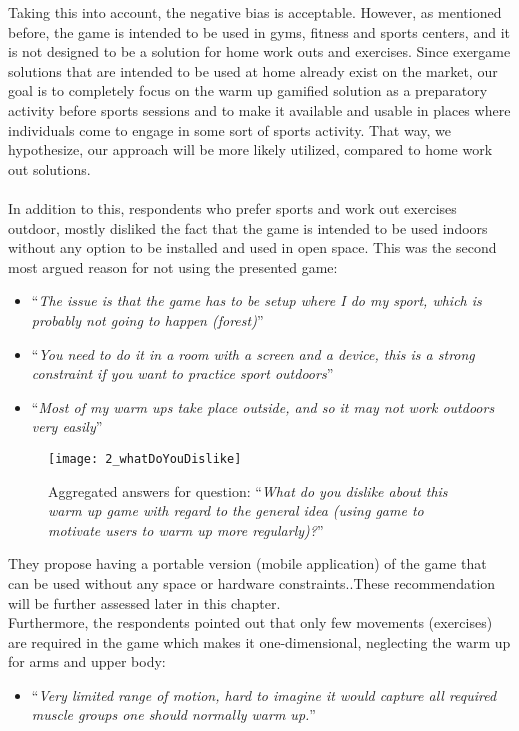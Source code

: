 Taking this into account, the negative bias is acceptable. However, as mentioned before, the game is intended to be used in gyms, fitness and sports centers, and it is not designed to be a solution for home work outs and exercises. Since exergame solutions that are intended to be used at home already exist on the market, our goal is to completely focus on the warm up gamified solution as a preparatory activity before sports sessions and to make it available and usable in places where individuals come to engage in some sort of sports activity. That way, we hypothesize, our approach will be more likely utilized, compared to home work out solutions. \\\\In addition to this, respondents who prefer sports and work out exercises outdoor, mostly disliked the fact that the game is intended to be used indoors without any option to be installed and used in open space. This was the second most argued reason for not using the presented game:
\begin{itemize}
\item ``\textit{The issue is that the game has to be setup where I do my sport, which is probably not going to happen (forest)}''
\item ``\textit{You need to do it in a room with a screen and a device, this is a strong constraint if you want to practice sport outdoors}''
\item ``\textit{Most of my warm ups take place outside, and so it may not work outdoors very easily}''
\end{itemize}
\begin{figure}[h]
    \centering
    \texttt{[image: 2\_whatDoYouDislike]}
    \caption{Aggregated answers for question: ``\textit{What do you dislike about this warm up game with regard to the general idea (using game to motivate users to warm up more regularly)?}''}
    \label{fig:2_whatDoYouDislike}
\end{figure}
They propose having a portable version (mobile application) of the game that can be used without any space or hardware constraints..These recommendation will be further assessed later in this chapter.\\ Furthermore, the respondents pointed out that only few movements (exercises) are required in the game which makes it one-dimensional, neglecting the warm up for arms and upper body:
\begin{itemize}
\item ``\textit{Very limited range of motion, hard to imagine it would capture all required muscle groups one should normally warm up.}''
\end{itemize}
